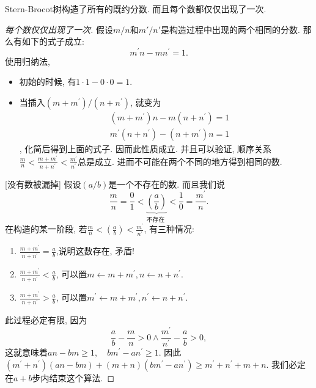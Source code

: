\documentclass{ctexart}
\begin{document}
\begin{theorem} Stern-Brocot树构造了所有的既约分数. 而且每个数都仅仅出现了一次. 
    
\end{theorem}

\begin{proof}
    [每个数仅仅出现了一次] 假设$m/n$和$m'/n'$是构造过程中出现的两个相同的分数. 那么有如下的式子成立: 
    $$m^{\prime} n-m n^{\prime}=1. $$
    使用归纳法, 
    \begin{itemize}
        \item 初始的时候, 有$1 \cdot 1-0 \cdot 0=1$. 
        \item 当插入$\left(m+m^{\prime}\right) /\left(n+n^{\prime}\right)$, 就变为$$\begin{aligned} & \left(m+m^{\prime}\right) n-m\left(n+n^{\prime}\right)=1 \\ & m^{\prime}\left(n+n^{\prime}\right)-\left(n+m^{\prime}\right) n=1\end{aligned}$$, 化简后得到上面的式子. 因而此性质成立. 并且可以验证, 顺序关系$\frac{m}{n}<\frac{m+m^{\prime}}{n+n^{\prime}}<\frac{m^{\prime}}{n^{\prime}}$总是成立. 进而不可能在两个不同的地方得到相同的数. 
    \end{itemize}

    [没有数被漏掉] 假设$(a/b)$是一个不存在的数. 而且我们说$$\frac{m}{n}=\frac{0}{1}<\underbrace{\left(\frac{a}{b}\right)}_{\text {不存在 }}<\frac{1}{0}=\frac{m^{\prime}}{n}.$$
    在构造的某一阶段, 若$\frac{m}{n}<\left(\frac{a}{b}\right)<\frac{m^{\prime}}{n^{\prime}}$, 有三种情况:
    \begin{enumerate}
        \item $\frac{m+m^{\prime}}{n+n^{\prime}}=\frac{a}{b}$,说明这数存在, 矛盾! 
        \item $\frac{m+m^{\prime}}{n+n^{\prime}}<\frac{a}{b}$, 可以置$m \leftarrow m+m^{\prime}, n \leftarrow n+n^{\prime}$.
        \item $\frac{m+m^{\prime}}{n+n^{\prime}}>\frac{a}{b}$, 可以置$m^{\prime} \leftarrow m+m^{\prime}, n^{\prime} \leftarrow n+n^{\prime}$.
    \end{enumerate}
此过程必定有限, 因为$$\frac{a}{b}-\frac{m}{n}>0 \land \frac{m^{\prime}}{n^{\prime}}-\frac{a}{b}>0, $$这就意味着$a n-b m \geqslant 1, \quad b m^{\prime}-a n^{\prime} \geqslant 1$. 因此$\left(m^{\prime}+n^{\prime}\right)(a n-b m)+(m+n)\left(b m^{\prime}-a n^{\prime}\right) \geqslant m^{\prime}+n^{\prime}+m+n$. 我们必定在$a+b$步内结束这个算法. 
\end{proof}
\end{document}
